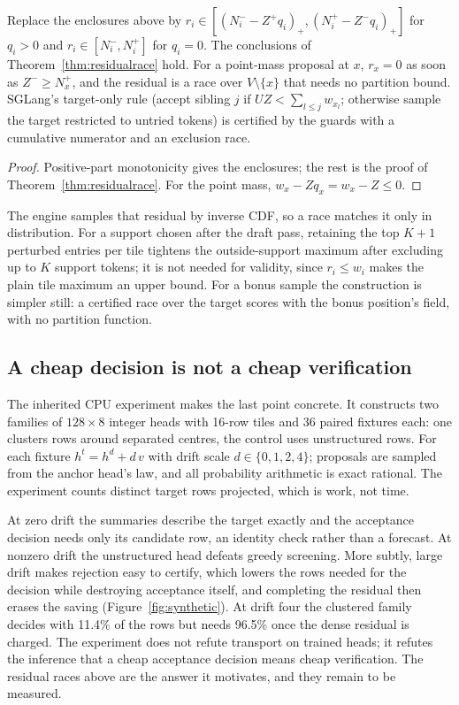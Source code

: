 \begin{theorem}\label{thm:residualself}
Replace the enclosures above by $r_i\in[(N^-_i-Z^+q_i)_+,(N^+_i-Z^-q_i)_+]$ for $q_i>0$ and $r_i\in[N_i^-,N_i^+]$ for $q_i=0$. The conclusions of Theorem~\ref{thm:residualrace} hold. For a point-mass proposal at $x$, $r_x=0$ as soon as $Z^-\ge N^+_x$, and the residual is a race over $V\setminus\{x\}$ that needs no partition bound. SGLang's target-only rule (accept sibling $j$ if $UZ<\sum_{l\le j}w_{x_l}$; otherwise sample the target restricted to untried tokens) is certified by the guards with a cumulative numerator and an exclusion race.
\end{theorem}
\begin{proof}
Positive-part monotonicity gives the enclosures; the rest is the proof of Theorem~\ref{thm:residualrace}. For the point mass, $w_x-Zq_x=w_x-Z\le0$.
\end{proof}
The engine samples that residual by inverse CDF, so a race matches it only in distribution. For a support chosen after the draft pass, retaining the top $K+1$ perturbed entries per tile tightens the outside-support maximum after excluding up to $K$ support tokens; it is not needed for validity, since $r_i\le w_i$ makes the plain tile maximum an upper bound. For a bonus sample the construction is simpler still: a certified race over the target scores with the bonus position's field, with no partition function.

\subsection{A cheap decision is not a cheap verification}\label{sec:synthetic}
The inherited CPU experiment makes the last point concrete. It constructs two families of $128\times8$ integer heads with 16-row tiles and 36 paired fixtures each: one clusters rows around separated centres, the control uses unstructured rows. For each fixture $h^t=h^d+d\,v$ with drift scale $d\in\{0,1,2,4\}$; proposals are sampled from the anchor head's law, and all probability arithmetic is exact rational. The experiment counts distinct target rows projected, which is work, not time.

At zero drift the summaries describe the target exactly and the acceptance decision needs only its candidate row, an identity check rather than a forecast. At nonzero drift the unstructured head defeats greedy screening. More subtly, large drift makes rejection easy to certify, which lowers the rows needed for the decision while destroying acceptance itself, and completing the residual then erases the saving (Figure~\ref{fig:synthetic}). At drift four the clustered family decides with 11.4\% of the rows but needs 96.5\% once the dense residual is charged. The experiment does not refute transport on trained heads; it refutes the inference that a cheap acceptance decision means cheap verification. The residual races above are the answer it motivates, and they remain to be measured.

